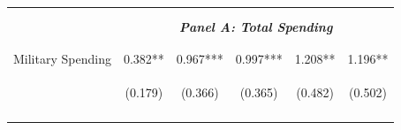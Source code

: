 \documentclass[dv_diss_main.tex]{subfiles}
\begin{document}
\begin{table}[H]
\begin{center}
\begin{tabular}{lccccc}
    \vspace{-2pt} & \vspace{-2pt} & \vspace{-2pt} & \vspace{-2pt} & \vspace{-2pt} \\\hline
    \vspace{-1.5pt} & \vspace{-1.5pt} & \vspace{-1.5pt} & \vspace{-1.5pt} & \vspace{-1.5pt} \\
    \cmidrule{2-6}
    \vspace{-1.5pt} & \vspace{-1.5pt} & \vspace{-1.5pt} & \vspace{-1.5pt} & \vspace{-1.5pt} \\
    & \multicolumn{5}{c}{\textit{\textbf{Panel A: Total Spending}}} \\ 
    \vspace{-1.5pt} & \vspace{-1.5pt} & \vspace{-1.5pt} & \vspace{-1.5pt} & \vspace{-1.5pt} \\ 
    \cmidrule{2-6}
    \vspace{-1.5pt} & \vspace{-1.5pt} & \vspace{-1.5pt} & \vspace{-1.5pt} & \vspace{-1.5pt}\\
    Military Spending & 0.382** & 0.967*** & 0.997*** & 1.208** & 1.196** \\
    & \begin{footnotesize}(0.179)\end{footnotesize} & \begin{footnotesize}(0.366)\end{footnotesize} & \begin{footnotesize}(0.365)\end{footnotesize} & \begin{footnotesize}(0.482)\end{footnotesize} & \begin{footnotesize}(0.502)\end{footnotesize} \\
    \vspace{-1.5pt} & \vspace{-1.5pt} & \vspace{-1.5pt} & \vspace{-1.5pt} & \vspace{-1.5pt} \\
    

\end{tabular}
\end{center}
\end{table}
\end{document}
